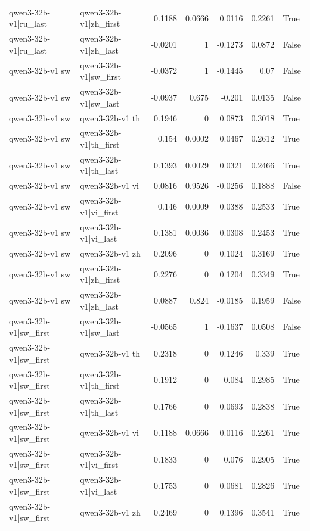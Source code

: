 \begin{table}
\begin{tabular}{l l r r r r l}
qwen3-32b-v1|ru_last & qwen3-32b-v1|zh_first & 0.1188 & 0.0666 & 0.0116 & 0.2261 & True \\
qwen3-32b-v1|ru_last & qwen3-32b-v1|zh_last & -0.0201 & 1 & -0.1273 & 0.0872 & False \\
qwen3-32b-v1|sw & qwen3-32b-v1|sw_first & -0.0372 & 1 & -0.1445 & 0.07 & False \\
qwen3-32b-v1|sw & qwen3-32b-v1|sw_last & -0.0937 & 0.675 & -0.201 & 0.0135 & False \\
qwen3-32b-v1|sw & qwen3-32b-v1|th & 0.1946 & 0 & 0.0873 & 0.3018 & True \\
qwen3-32b-v1|sw & qwen3-32b-v1|th_first & 0.154 & 0.0002 & 0.0467 & 0.2612 & True \\
qwen3-32b-v1|sw & qwen3-32b-v1|th_last & 0.1393 & 0.0029 & 0.0321 & 0.2466 & True \\
qwen3-32b-v1|sw & qwen3-32b-v1|vi & 0.0816 & 0.9526 & -0.0256 & 0.1888 & False \\
qwen3-32b-v1|sw & qwen3-32b-v1|vi_first & 0.146 & 0.0009 & 0.0388 & 0.2533 & True \\
qwen3-32b-v1|sw & qwen3-32b-v1|vi_last & 0.1381 & 0.0036 & 0.0308 & 0.2453 & True \\
qwen3-32b-v1|sw & qwen3-32b-v1|zh & 0.2096 & 0 & 0.1024 & 0.3169 & True \\
qwen3-32b-v1|sw & qwen3-32b-v1|zh_first & 0.2276 & 0 & 0.1204 & 0.3349 & True \\
qwen3-32b-v1|sw & qwen3-32b-v1|zh_last & 0.0887 & 0.824 & -0.0185 & 0.1959 & False \\
qwen3-32b-v1|sw_first & qwen3-32b-v1|sw_last & -0.0565 & 1 & -0.1637 & 0.0508 & False \\
qwen3-32b-v1|sw_first & qwen3-32b-v1|th & 0.2318 & 0 & 0.1246 & 0.339 & True \\
qwen3-32b-v1|sw_first & qwen3-32b-v1|th_first & 0.1912 & 0 & 0.084 & 0.2985 & True \\
qwen3-32b-v1|sw_first & qwen3-32b-v1|th_last & 0.1766 & 0 & 0.0693 & 0.2838 & True \\
qwen3-32b-v1|sw_first & qwen3-32b-v1|vi & 0.1188 & 0.0666 & 0.0116 & 0.2261 & True \\
qwen3-32b-v1|sw_first & qwen3-32b-v1|vi_first & 0.1833 & 0 & 0.076 & 0.2905 & True \\
qwen3-32b-v1|sw_first & qwen3-32b-v1|vi_last & 0.1753 & 0 & 0.0681 & 0.2826 & True \\
qwen3-32b-v1|sw_first & qwen3-32b-v1|zh & 0.2469 & 0 & 0.1396 & 0.3541 & True \\

\end{tabular}
\end{table}
